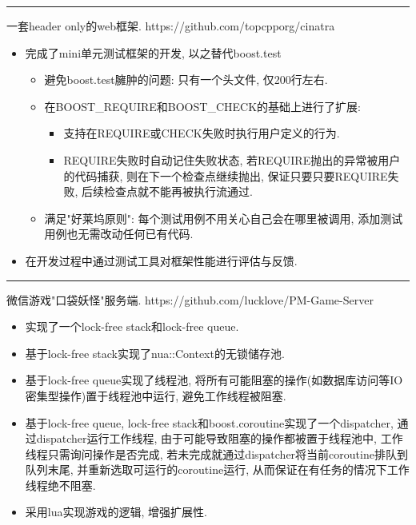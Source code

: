 \documentclass{resume}
\newcommand{\subsectionrule}{{\vspace{-8pt}\hspace{0.5cm}\rule[1pt]{\linewidth-1cm}{0.05pt}\vspace{-8pt}}}
\begin{document}
\subsectionrule

\begin{onehalfspacing}
一套header only的web框架. 
\newline
https://github.com/topcpporg/cinatra
\begin{itemize}
  \item 完成了mini单元测试框架的开发, 以之替代boost.test
  \begin{itemize}
    \item 避免boost.test臃肿的问题: 只有一个头文件, 仅200行左右.
    \item 在BOOST\_REQUIRE和BOOST\_CHECK的基础上进行了扩展:
    \begin{itemize}
        \item 支持在REQUIRE或CHECK失败时执行用户定义的行为.
        \item REQUIRE失败时自动记住失败状态, 若REQUIRE抛出的异常被用户的代码捕获, 则在下一个检查点继续抛出, 保证只要只要REQUIRE失败, 后续检查点就不能再被执行流通过.
    \end{itemize}
    \item 满足"好莱坞原则": 每个测试用例不用关心自己会在哪里被调用, 添加测试用例也无需改动任何已有代码.
  \end{itemize}
  \item 在开发过程中通过测试工具对框架性能进行评估与反馈.
\end{itemize}
\end{onehalfspacing}

\subsectionrule

\begin{onehalfspacing}
微信游戏"口袋妖怪"服务端.
\newline
https://github.com/lucklove/PM-Game-Server
\begin{itemize}
  \item 实现了一个lock-free stack和lock-free queue.
  \item 基于lock-free stack实现了nua::Context的无锁储存池.
  \item 基于lock-free queue实现了线程池, 将所有可能阻塞的操作(如数据库访问等IO密集型操作)置于线程池中运行, 避免工作线程被阻塞.
  \item 基于lock-free queue, lock-free stack和boost.coroutine实现了一个dispatcher, 通过dispatcher运行工作线程, 由于可能导致阻塞的操作都被置于线程池中, 工作线程只需询问操作是否完成, 若未完成就通过dispatcher将当前coroutine排队到队列末尾, 并重新选取可运行的coroutine运行, 从而保证在有任务的情况下工作线程绝不阻塞.
  \item 采用lua实现游戏的逻辑, 增强扩展性.
\end{itemize}
\end{onehalfspacing}
\end{document}
